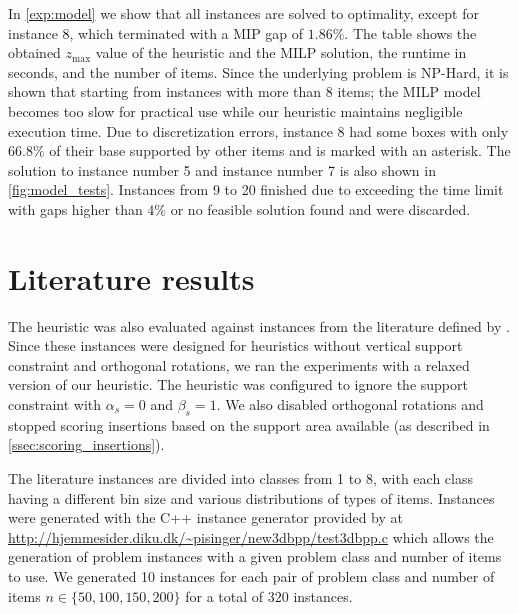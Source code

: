 In \cref{exp:model} we show that all instances are solved to optimality, except for instance 8, which terminated with a MIP gap of $1.86\%$.
The table shows the obtained $z_{\text{max}}$ value of the heuristic and the MILP solution, the runtime in seconds, and the number of items.
Since the underlying problem is NP-Hard, it is shown that starting from instances with more than 8 items; the MILP model becomes too slow for practical use while our heuristic maintains negligible execution time.
Due to discretization errors, instance 8 had some boxes with only $66.8\%$ of their base supported by other items and is marked with an asterisk.
The solution to instance number 5 and instance number 7 is also shown in \cref{fig:model_tests}.
Instances from 9 to 20 finished due to exceeding the time limit with gaps higher than $4\%$ or no feasible solution found and were discarded.
\label{exp:model_tests}



\clearpage
\section{Literature results}
The heuristic was also evaluated against instances from the literature defined by \cite{martello2000three}.
Since these instances were designed for heuristics without vertical support constraint and orthogonal rotations, we ran the experiments with a relaxed version of our heuristic.
The heuristic was configured to ignore the support constraint with $\alpha_s = 0$ and $\beta_s = 1$. We also disabled orthogonal rotations and stopped scoring insertions based on the support area available (as described in \cref{ssec:scoring_insertions}).

\label{def:class1_instances}
The literature instances are divided into classes from 1 to 8, with each class having a different bin size and various distributions of types of items.
Instances were generated with the C++ instance generator provided by \cite{martello2000three} at \url{http://hjemmesider.diku.dk/~pisinger/new3dbpp/test3dbpp.c} which allows the generation of problem instances with a given problem class and number of items to use.
We generated 10 instances for each pair of problem class and number of items $n \in \{50, 100, 150, 200\}$ for a total of $320$ instances.


